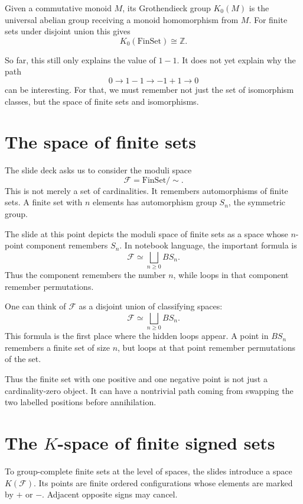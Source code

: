 \begin{definition}
Given a commutative monoid \(M\), its Grothendieck group \(K_0(M)\) is the universal abelian group receiving a monoid homomorphism from \(M\).  For finite sets under disjoint union this gives
\[
  K_0(\mathrm{FinSet})\cong\mathbb Z.
\]
\end{definition}

So far, this still only explains the value of \(1-1\).  It does not yet explain why the path
\[
  0\to 1-1\to -1+1\to 0
\]
can be interesting.  For that, we must remember not just the set of isomorphism classes, but the space of finite sets and isomorphisms.

\section{The space of finite sets}

The slide deck asks us to consider the moduli space
\[
  \mathcal F=\mathrm{FinSet}/\sim.
\]
This is not merely a set of cardinalities.  It remembers automorphisms of finite sets.  A finite set with \(n\) elements has automorphism group \(S_n\), the symmetric group.

\begin{remark}
The slide at this point depicts the moduli space of finite sets as a space whose \(n\)-point component remembers \(S_n\).  In notebook language, the important formula is
\[
  \mathcal F\simeq \bigsqcup_{n\ge0}BS_n.
\]
Thus the component remembers the number \(n\), while loops in that component remember permutations.
\end{remark}


One can think of \(\mathcal F\) as a disjoint union of classifying spaces:
\[
  \mathcal F\simeq \bigsqcup_{n\ge0}BS_n.
\]
This formula is the first place where the hidden loops appear.  A point in \(BS_n\) remembers a finite set of size \(n\), but loops at that point remember permutations of the set.

Thus the finite set with one positive and one negative point is not just a cardinality-zero object.  It can have a nontrivial path coming from swapping the two labelled positions before annihilation.

\section[The K-space of finite signed sets]{The \(K\)-space of finite signed sets}

To group-complete finite sets at the level of spaces, the slides introduce a space \(K(\mathcal F)\).  Its points are finite ordered configurations whose elements are marked by \(+\) or \(-\).  Adjacent opposite signs may cancel.


